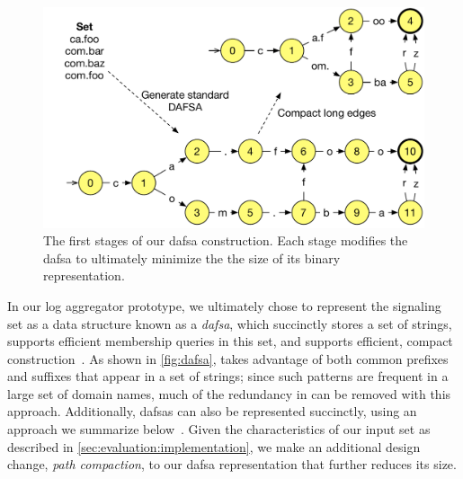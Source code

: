 \begin{figure}
  \centering
  \includegraphics[width=.9\linewidth]{fig/dafsa_combined}
  \caption{The first stages of our \ac{dafsa} construction. 
           Each stage modifies the \ac{dafsa} to ultimately minimize the 
           the size of its binary representation.}
  \label{fig:dafsa}
\end{figure}

In our log aggregator prototype, we ultimately chose to represent the signaling
set as a data structure known as a \emph{\acf{dafsa}}, which succinctly stores a
set of strings, supports efficient membership queries in this set, and supports 
efficient, compact construction~\cite{daciuk2000incremental}. As shown
in \autoref{fig:dafsa},  takes advantage of both common prefixes and
suffixes that appear in a set of strings; since such patterns are frequent in a
large set of domain names, much of the redundancy in \httpsset can be removed with this
approach. Additionally, \acp{dafsa} can also be represented succinctly, using an
approach we summarize below~\cite{daciuk2012smaller}. Given the characteristics
of our input set as described in \autoref{sec:evaluation:implementation}, we
make an additional design change, \emph{path compaction},
to our \ac{dafsa} representation that further reduces its size.

